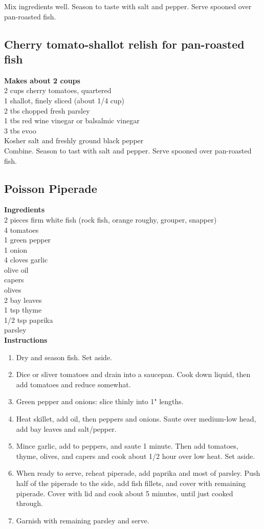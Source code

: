 \documentclass{article}
\numberwithin{figure}{section}
\numberwithin{equation}{section}
\begin{document}
Mix ingredients well. Season to taste with salt and pepper. Serve spooned over pan-roasted fish.

\subsection{Cherry tomato-shallot relish for pan-roasted fish}
{\bf Makes about 2 coups}\\
2 cups cherry tomatoes, quartered\\
1 shallot, finely sliced (about 1/4 cup)\\
2 tbs chopped fresh parsley\\
1 tbs red wine vinegar or balsalmic vinegar\\
3 tbs evoo\\
Kosher salt and freshly ground black pepper\\

Combine. Season to tast with salt and pepper. Serve spooned over pan-roasted fish.

\pagebreak
\subsection{Poisson Piperade}
{\bf Ingredients}\\
2 pieces firm white fish (rock fish, orange roughy, grouper, snapper)\\
4 tomatoes\\
1 green pepper\\
1 onion\\
4 cloves garlic\\
olive oil\\
capers\\
olives\\
2 bay leaves\\
1 tsp thyme\\
1/2 tsp paprika\\
parsley\\

{\bf Instructions}
\begin{enumerate}
\item Dry and season fish.  Set aside.
\item Dice or sliver tomatoes and drain into a saucepan. Cook down liquid, then add tomatoes and reduce somewhat.
\item Green pepper and onions: slice thinly into 1" lengths.
\item Heat skillet, add oil, then peppers and onions. Saute over medium-low head, add bay leaves and salt/pepper.
\item Mince garlic, add to peppers, and saute 1 minute. Then add tomatoes, thyme, olives, and capers and cook about 1/2 hour over low heat. Set aside.
\item When ready to serve, reheat piperade, add paprika and most of parsley. Push half of the piperade to the side, add fish fillets, and cover with remaining piperade. Cover with lid and cook about 5 minutes, until just cooked through. 
\item Garnish with remaining parsley and serve.
\end{enumerate}
\end{document}
